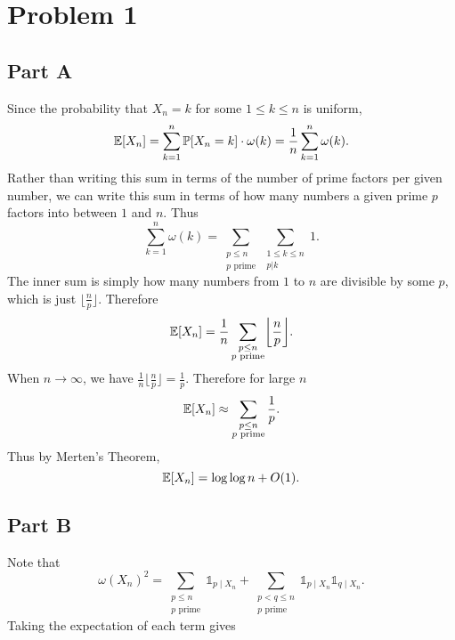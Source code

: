 \documentclass{eeleyes}
\begin{document}
\section*{Problem 1}
\subsection*{Part A}
Since the probability that $X_n = k$ for some $1 \leq k \leq n$ is uniform,
\[
    \expp{X_n} = \sum_{k=1}^n \prob{X_n = k} \cdot \omega(k) = \frac{1}{n} \sum_{k=1}^n \omega(k)
.\]
Rather than writing this sum in terms of the number of prime factors per given number, we can write this sum in terms of how many numbers a given prime $p$ factors into between $1$ and $n$. Thus
\[
    \sum_{k=1}^n \omega(k) = \sum_{\substack{p \leq n \\ p \text{ prime}}} \sum_{\substack{1 \leq k \leq n \\ p | k}} 1
.\]
The inner sum is simply how many numbers from $1$ to $n$ are divisible by some $p$, which is just $\lfloor\frac{n}{p}\rfloor$. Therefore
\[
    \expp{X_n} = \frac{1}{n} \sum_{\substack{p \leq n \\ p\text{ prime}}} \left\lfloor \frac{n}{p} \right\rfloor
.\]
When $n \to \infty$, we have $\frac{1}{n} \lfloor \frac{n}{p} \rfloor = \frac{1}{p}$. Therefore for large $n$
\[
    \expp{X_n} \approx \sum_{\substack{p \leq n \\ p\text{ prime}}} \frac{1}{p}
.\]
Thus by Merten's Theorem,
\[
    \expp{X_n} = \log\log n + O(1)
.\]

\subsection*{Part B}
Note that
\[
    \omega(X_n)^2 = \sum_{\substack{p \leq n \\ p\text{ prime}}} \mathbb{1}_{p \mid X_n} + \sum_{\substack{p < q \leq n \\ p\text{ prime}}} \mathbb{1}_{p \mid X_n} \mathbb{1}_{q \mid X_n}
.\]
Taking the expectation of each term gives
\end{document}

